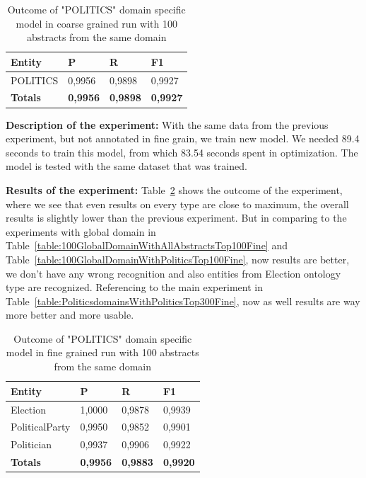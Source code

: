 \documentclass[thesis=M,english]{FITthesis}[2018/05/30]
\begin{document}
	\begin{table}[H]\centering
		\begin{tabular}{|l|l|l|l|}
			\hline {\textbf{Entity}} & {\textbf{P}} & {\textbf{R}} & {\textbf{F1}}\\\hline
				POLITICS & 0,9956 & 0,9898 & 0,9927\\\hline
				\textbf{Totals} & \textbf{0,9956} & \textbf{0,9898} & \textbf{0,9927}\\\hline
		\end{tabular}
		\caption{Outcome of "POLITICS" domain specific model in coarse grained run with 100 abstracts from the same domain \label{table:100PoliticsDomainWithPoliticsTop100Coarse}}
	\end{table}


	\textbf{Description of the experiment:} With the same data from the previous experiment, but not annotated in fine grain, we train new model. We needed 89.4 seconds to train this model, from which 83.54 seconds spent in optimization. The model is tested with the same dataset that was trained.

	\textbf{Results of the experiment:} Table~\ref{table:100PoliticsDomainWithPoliticsTop100Fine} shows the outcome of the experiment, where we see that even results on every type are close to maximum, the overall results is slightly lower than the previous experiment. But in comparing to the experiments with global domain in Table~\ref{table:100GlobalDomainWithAllAbstractsTop100Fine} and Table~\ref{table:100GlobalDomainWithPoliticsTop100Fine}, now results are better, we don't have any wrong recognition and also entities from Election ontology type are recognized. Referencing to the main experiment in Table~\ref{table:PoliticsdomainsWithPoliticsTop300Fine}, now as well results are way more better and more usable.

	\begin{table}[H]\centering
		\begin{tabular}{|l|l|l|l|}
			\hline {\textbf{Entity}} & {\textbf{P}} & {\textbf{R}} & {\textbf{F1}}\\\hline
				Election & 1,0000 & 0,9878 & 0,9939\\
				PoliticalParty & 0,9950 & 0,9852 & 0,9901\\
				Politician & 0,9937 & 0,9906 & 0,9922\\\hline
				\textbf{Totals} & \textbf{0,9956} & \textbf{0,9883} & \textbf{0,9920}\\\hline
		\end{tabular}
		\caption{Outcome of "POLITICS" domain specific model in fine grained run with 100 abstracts from the same domain \label{table:100PoliticsDomainWithPoliticsTop100Fine}}
	\end{table}	
	
\end{document}
